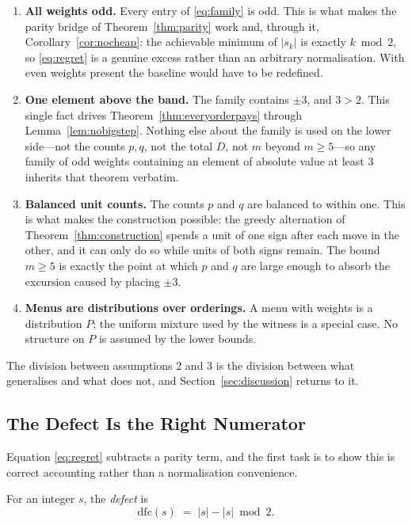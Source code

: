 \begin{enumerate}
\item[1)] \textbf{All weights odd.} Every entry of \eqref{eq:family} is odd. This is what
makes the parity bridge of Theorem~\ref{thm:parity} work and, through it,
Corollary~\ref{cor:nocheap}: the achievable minimum of $|s_{k}|$ is exactly $k\bmod2$, so
\eqref{eq:regret} is a genuine excess rather than an arbitrary normalisation. With even
weights present the baseline would have to be redefined.

\item[2)] \textbf{One element above the band.} The family contains $\pm3$, and $3>2$. This
single fact drives Theorem~\ref{thm:everyorderpays} through
Lemma~\ref{lem:nobigstep}. Nothing else about the family is used on the lower side---not the
counts $p,q$, not the total $D$, not $m$ beyond $m\ge5$---so any family of odd weights
containing an element of absolute value at least $3$ inherits that theorem verbatim.

\item[3)] \textbf{Balanced unit counts.} The counts $p$ and $q$ are balanced to within one.
This is what makes the construction possible: the greedy alternation of
Theorem~\ref{thm:construction} spends a unit of one sign after each move in the other, and it
can only do so while units of both signs remain. The bound $m\ge5$ is exactly the point at
which $p$ and $q$ are large enough to absorb the excursion caused by placing $\pm3$.

\item[4)] \textbf{Menus are distributions over orderings.} A menu with weights is a
distribution $P$; the uniform mixture used by the witness is a special case. No structure on
$P$ is assumed by the lower bounds.
\end{enumerate}

The division between assumptions 2 and 3 is the division between what generalises and what
does not, and Section~\ref{sec:discussion} returns to it.

\subsection{The Defect Is the Right Numerator}
\label{sec:defect}

Equation \eqref{eq:regret} subtracts a parity term, and the first task is to show this is
correct accounting rather than a normalisation convenience.

\begin{definition}[Defect]
For an integer $s$, the \emph{defect} is
\begin{equation}
\mathrm{dfc}(s)\;=\;|s|-|s|\bmod 2 .
\label{eq:dfc}
\end{equation}
\end{definition}

